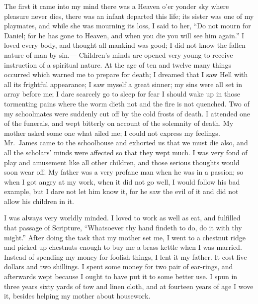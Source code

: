 \documentclass{article}
\renewcommand\footnote[1]{} %
\begin{document}
The first it came into my mind there was a Heaven o'er yonder sky where pleasure never dies, there was an infant departed this life; its sister was one of my playmates, and while she was mourning its loss, I said to her, ``Do not mourn for Daniel; for he has gone to Heaven, and when you die you will see him again.''
I loved every body, and thought all mankind was good; I did not know the fallen nature of man by sin.---
Children's minds are opened very young to receive instruction of a spiritual nature.
At the age of ten and twelve\footnote{in the years 1811 and 1813} many things occurred which warned me to prepare for death; I dreamed that I saw Hell with all its frightful appearance; I saw myself a great sinner; my sins were all set in array before me; I dare scarcely go to sleep for fear I should wake up in those tormenting pains where the worm dieth not and the fire is not quenched.
Two of my schoolmates were suddenly cut off by the cold frosts of death.
I attended one of the funerals, and wept bitterly on account of the solemnity of death.
My mother asked some one what ailed me; I could not express my feelings.
Mr.\ James came to the schoolhouse and exhorted us that we must die also, and all the scholars' minds were affected so that they wept much.
I was very fond of play and amusement like all other children, and those serious thoughts would soon wear off.
My father was a very profane man when he was in a passion; so when I got angry at my work, when it did not go well, I would follow his bad example, but I dare not let him know it, for he saw the evil of it and did not allow his children in it.

I was always very worldly minded.
I loved to work as well as eat, and fulfilled that passage of Scripture, ``Whatsoever thy hand findeth to do, do it with thy might.''
After doing the task that my mother set me, I went to a chestnut ridge and picked up chestnuts enough to buy me a brass kettle when I was married.
Instead of spending my money for foolish things, I lent it my father.
It cost five dollars and two shillings.
I spent some money for two pair of ear-rings, and afterwards wept because I ought to have put it to some better use.
I spun in three years sixty yards of tow and linen cloth, and at fourteen years of age\footnote{in 1815} I wove it, besides helping my mother about housework.
\end{document}
